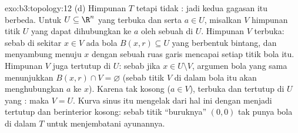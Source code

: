 \begin{solution}{exo:b3:topology:12}
(d) Himpunan $T$  tetapi tidak : jadi kedua gagasan itu
berbeda. Untuk $U \subseteq \R^n$ yang terbuka dan  serta $a \in U$,
misalkan $V$ himpunan titik $U$ yang dapat dihubungkan ke $a$ oleh
sebuah  di $U$. Himpunan $V$ terbuka: sebab di sekitar $x \in V$ ada bola $B(x, r)
\subseteq U$ yang berbentuk bintang, dan menyambung  menuju $x$
dengan sebuah ruas garis mencapai setiap titik bola itu. Himpunan $V$ juga
tertutup di $U$: sebab jika $x \in U \setminus V$, argumen bola yang sama
menunjukkan $B(x, r) \cap V = \varnothing$ (sebab titik
$V$ di dalam bola itu akan menghubungkan $a$ ke $x$). Karena tak kosong ($a \in
V$), terbuka dan tertutup di $U$ yang : maka $V = U$. Kurva
sinus itu mengelak dari hal ini dengan menjadi tertutup dan berinterior kosong: sebab
titik ``buruknya'' $(0,0)$ tak punya bola di dalam $T$ untuk menjembatani
ayunannya.
\end{solution}

